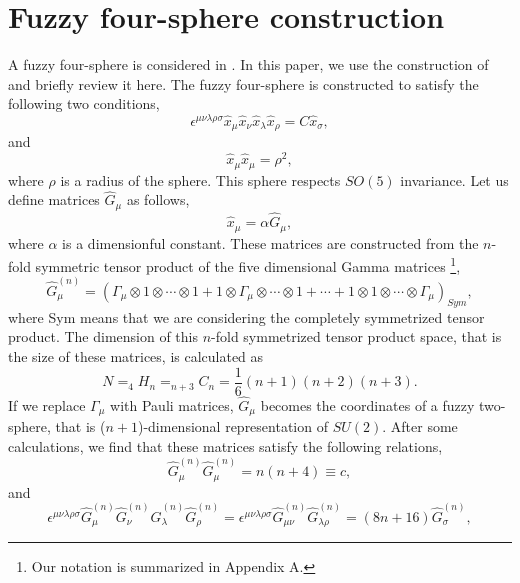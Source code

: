 \documentclass[a4paper,11pt]{article}
\begin{document}
\section{Fuzzy four-sphere construction}
\hspace{0.4cm}
A fuzzy four-sphere is considered in 
\cite{GroLP,castelino,CMT}. 
In this paper, we use the construction of \cite{castelino} 
and briefly review it here. 
The fuzzy four-sphere is constructed to satisfy the 
following two conditions, 
\begin{equation}
\epsilon^{\mu\nu\lambda\rho\sigma}
\hat{x}_{\mu}\hat{x}_{\nu}\hat{x}_{\lambda}\hat{x}_{\rho}
=C\hat{x}_{\sigma}, 
\label{foursphererelation}
\end{equation}
and
\begin{equation}
\hat{x}_{\mu}\hat{x}_{\mu}=\rho^{2}, 
\label{spherecondition}
\end{equation}
where $\rho$ is a radius of the sphere. 
This sphere respects $SO(5)$ invariance. 
Let us define matrices $\hat{G}_{\mu}$ as follows, 
\begin{equation}
\hat{x}_{\mu}=\alpha\hat{G}_{\mu},   
\end{equation}
where $\alpha$ is a dimensionful constant. 
These matrices are constructed from 
the $n$-fold symmetric tensor product of 
the five dimensional Gamma matrices
\footnote{Our notation is summarized in Appendix A.}, 
\begin{equation}
\hat{G}_{\mu}^{(n)}=\left(
\Gamma_{\mu}\otimes 1\otimes \cdots \otimes 1
+1\otimes \Gamma_{\mu} \otimes \cdots \otimes 1
+\cdots 
+1\otimes 1\otimes \cdots \otimes \Gamma_{\mu}
\right)_{Sym},
\label{defGmatrix}
\end{equation}
where Sym means that we are 
considering the completely symmetrized tensor product. 
The dimension of this $n$-fold symmetrized tensor product 
space, that is the size of these matrices, is calculated as 
\begin{equation}
N=_{4}H_{n}=_{n+3}C_{n}=\frac{1}{6}(n+1)(n+2)(n+3). 
\label{size}
\end{equation}
If we replace $\Gamma_{\mu}$ with Pauli matrices, 
$\hat{G}_{\mu}$ becomes the coordinates 
of a fuzzy two-sphere, that is 
($n+1$)-dimensional representation of $SU(2)$. 
After some calculations, we find that 
these matrices satisfy the following relations, 
\begin{equation}
\hat{G}_{\mu}^{(n)}\hat{G}_{\mu}^{(n)}=n(n+4) \equiv c, 
\label{ggc}
\end{equation}
and 
\begin{equation}
\epsilon^{\mu\nu\lambda\rho\sigma}
\hat{G}_{\mu}^{(n)}\hat{G}_{\nu}^{(n)}
\hat{G}_{\lambda}^{(n)}\hat{G}_{\rho}^{(n)}
=\epsilon^{\mu\nu\lambda\rho\sigma}
\hat{G}_{\mu\nu}^{(n)}
\hat{G}_{\lambda\rho}^{(n)}
=(8n+16)\hat{G}_{\sigma}^{(n)}, 
\label{commutationrelation} 
\end{equation}
\end{document}
